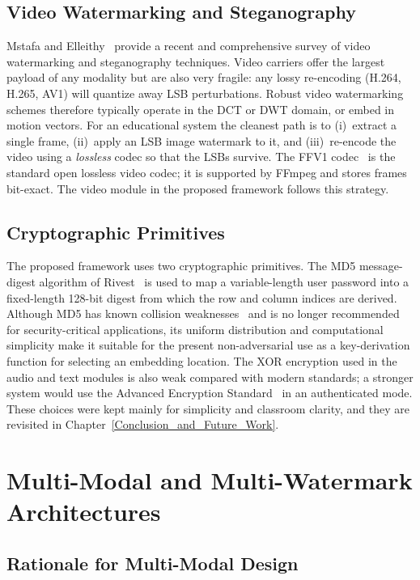 \subsection{Video Watermarking and Steganography}

Mstafa and Elleithy~\cite{mstafa2017comprehensive} provide a recent and comprehensive survey of video watermarking and steganography techniques. Video carriers offer the largest payload of any modality but are also very fragile: any lossy re-encoding (H.264, H.265, AV1) will quantize away LSB perturbations. Robust video watermarking schemes therefore typically operate in the DCT or DWT domain, or embed in motion vectors. For an educational system the cleanest path is to (i)~extract a single frame, (ii)~apply an LSB image watermark to it, and (iii)~re-encode the video using a \emph{lossless} codec so that the LSBs survive. The FFV1 codec~\cite{niedermayer2013ffv1} is the standard open lossless video codec; it is supported by FFmpeg and stores frames bit-exact. The video module in the proposed framework follows this strategy.

\subsection{Cryptographic Primitives}

The proposed framework uses two cryptographic primitives. The MD5 message-digest algorithm of Rivest~\cite{rivest1992md5} is used to map a variable-length user password into a fixed-length 128-bit digest from which the row and column indices are derived. Although MD5 has known collision weaknesses~\cite{wang2005how} and is no longer recommended for security-critical applications, its uniform distribution and computational simplicity make it suitable for the present non-adversarial use as a key-derivation function for selecting an embedding location. The XOR encryption used in the audio and text modules is also weak compared with modern standards; a stronger system would use the Advanced Encryption Standard~\cite{daemen2002design} in an authenticated mode. These choices were kept mainly for simplicity and classroom clarity, and they are revisited in Chapter~\ref{Conclusion_and_Future_Work}.

\section{Multi-Modal and Multi-Watermark Architectures}

\subsection{Rationale for Multi-Modal Design}

